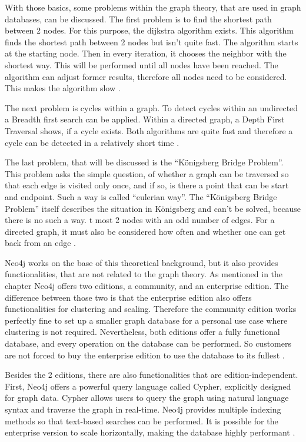 With those basics, some problems within the graph theory, that are used in graph databases, can be discussed. The first problem is to find the shortest path between 2 nodes. For this purpose, the dijkstra algorithm exists. This algorithm finds the shortest path between 2 nodes but isn't quite fast. The algorithm starts at the starting node. Then in every iteration, it chooses the neighbor with the shortest way. This will be performed until all nodes have been reached.
The algorithm can adjust former results, therefore all nodes need to be considered. This makes the algorithm slow \parencite{dijkstra}.

The next problem is cycles within a graph. To detect cycles within an undirected a Breadth first search can be applied. Within a directed graph, a Depth First Traversal shows, if a cycle exists. Both algorithms are quite fast and therefore a cycle can be detected in a relatively short time \parencite{graphCircle, cycle_directed}.

The last problem, that will be discussed is the \enquote{Königsberg Bridge Problem}. This problem asks the simple question, of whether a graph can be traversed so that each edge is visited only once, and if so, is there a point that can be start and endpoint. Such a way is called \enquote{eulerian way}. The
\enquote{Königsberg Bridge Problem}  itself describes the situation in Königsberg and can't be solved, because there is no such a way. t most 2 nodes with an odd number of edges. For a directed graph, it must also be considered how often and whether one can get back from an edge \parencite{koenigsberger}.

Neo4j works on the base of this theoretical background, but it also provides functionalities, that are not related to the graph theory. As mentioned in the chapter  Neo4j offers two editions, a community, and an enterprise edition. The difference between those two is that the enterprise edition also offers functionalities for clustering and scaling. Therefore the community edition works perfectly fine to set up a smaller
graph database for a personal use case where clustering is not required. Nevertheless, both editions offer a fully functional database, and every operation on the database can be performed. So customers are not forced to buy the enterprise edition to use the database to its fullest \parencite{Neo4jfeatures}.

Besides the 2 editions, there are also functionalities that are edition-independent. First, Neo4j offers a powerful query language called Cypher, explicitly designed for graph data. Cypher allows users to query the graph using natural language syntax and traverse the graph in real-time. Neo4j provides multiple indexing methods so that text-based searches can be performed.
It is possible for the enterprise version to scale horizontally, making the database highly performant \parencite{Neo4jfeatures}.

